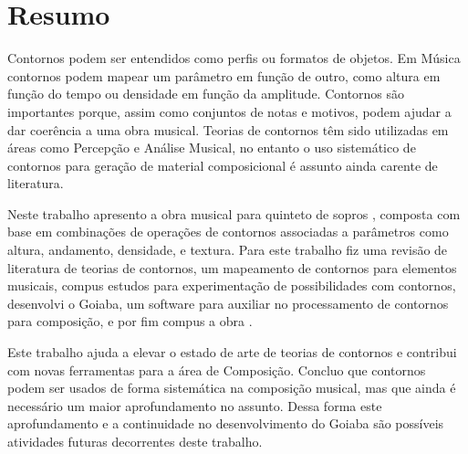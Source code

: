 \chapter*{Resumo}
\label{cha:resumo}

Contornos podem ser entendidos como perfis ou formatos de objetos. Em
Música contornos podem mapear um parâmetro em função de outro, como
altura em função do tempo ou densidade em função da
amplitude. Contornos são importantes porque, assim como conjuntos de
notas e motivos, podem ajudar a dar coerência a uma obra musical.
Teorias de contornos têm sido utilizadas em áreas como Percepção e
Análise Musical, no entanto o uso sistemático de contornos para
geração de material composicional é assunto ainda carente de
literatura.

Neste trabalho apresento a obra musical para quinteto de sopros
\obra{}, composta com base em combinações de operações de contornos
associadas a parâmetros como altura, andamento, densidade, e textura.
Para este trabalho fiz uma revisão de literatura de teorias de
contornos, um mapeamento de contornos para elementos musicais, compus
estudos para experimentação de possibilidades com contornos,
desenvolvi o Goiaba, um software para auxiliar no processamento de
contornos para composição, e por fim compus a obra \obra{}.

Este trabalho ajuda a elevar o estado de arte de teorias de contornos e
contribui com novas ferramentas para a área de Composição.
Concluo que contornos podem ser usados de forma sistemática na
composição musical, mas que ainda é necessário um maior aprofundamento
no assunto. Dessa forma este aprofundamento e a continuidade no
desenvolvimento do Goiaba são possíveis atividades futuras decorrentes
deste trabalho.
